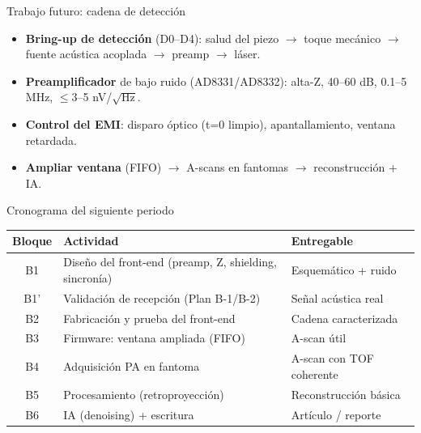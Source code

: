 \documentclass[aspectratio=169,12pt]{beamer}
\begin{document}
\begin{frame}{Trabajo futuro: cadena de detección}
  \begin{itemize}
    \item \textbf{Bring-up de detección} (D0–D4): salud del piezo $\rightarrow$
      toque mecánico $\rightarrow$ fuente acústica acoplada $\rightarrow$ preamp
      $\rightarrow$ láser.
    \item \textbf{Preamplificador} de bajo ruido (AD8331/AD8332): alta-Z, 40–60 dB,
      0.1–5 MHz, $\leq$3–5 nV/$\sqrt{\text{Hz}}$.
    \item \textbf{Control del EMI}: disparo óptico (t=0 limpio), apantallamiento,
      ventana retardada.
    \item \textbf{Ampliar ventana} (FIFO) $\rightarrow$ A-scans en fantomas
      $\rightarrow$ reconstrucción + IA.
  \end{itemize}
\end{frame}

\begin{frame}{Cronograma del siguiente periodo}
\centering\scriptsize
\begin{tabular}{cll}
\toprule
\textbf{Bloque} & \textbf{Actividad} & \textbf{Entregable} \\
\midrule
B1  & Diseño del front-end (preamp, Z, shielding, sincronía) & Esquemático + ruido \\
B1' & Validación de recepción (Plan B-1/B-2) & Señal acústica real \\
B2  & Fabricación y prueba del front-end & Cadena caracterizada \\
B3  & Firmware: ventana ampliada (FIFO) & A-scan útil \\
B4  & Adquisición PA en fantoma & A-scan con TOF coherente \\
B5  & Procesamiento (retroproyección) & Reconstrucción básica \\
B6  & IA (denoising) + escritura & Artículo / reporte \\
\bottomrule
\end{tabular}
\end{frame}
\end{document}
